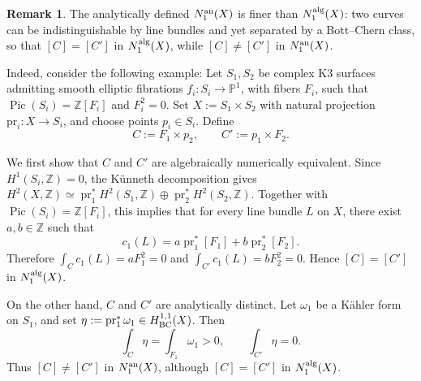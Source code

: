 \documentclass[11pt]{amsart}
\numberwithin{equation}{section}
\theoremstyle{definition}
\theoremstyle{definition}
\theoremstyle{definition}
\newtheorem{remark}[theorem]{Remark}
\begin{document}
\begin{remark}\label{l-anvsalg}
The analytically defined $N_1^{\rm an}(X)$ is finer than $N_1^{\rm alg}(X)$: two curves can be indistinguishable by line bundles and yet separated by a Bott–Chern class, so that $[C]=[C']$ in $N_1^{\rm alg}(X)$, while $[C]\neq[C']$ in $N_1^{\rm an}(X)$.

Indeed, consider the following example: Let $S_1,S_2$ be complex K3 surfaces admitting smooth elliptic fibrations $f_i:S_i\to \mathbb P^1$, with fibers $F_i$, such that $\operatorname{Pic}(S_i)=\mathbb Z[F_i]$ and $F_i^2=0$. Set $X:=S_1\times S_2$ with natural projection $\mathrm{pr}_i: X \to S_i$, and choose points $p_i\in S_i$. Define
$$
C:=F_1\times {p_2},\qquad C':={p_1}\times F_2.
$$

We first show that $C$ and $C'$ are algebraically numerically equivalent. Since $H^1(S_i,\mathbb Z)=0$, the Künneth decomposition gives $H^2(X,\mathbb Z)\simeq \operatorname{pr}_1^*H^2(S_1,\mathbb Z)\oplus \operatorname{pr}_2^*H^2(S_2,\mathbb Z)$. Together with $\operatorname{Pic}(S_i)=\mathbb Z[F_i]$, this implies that for every line bundle $L$ on $X$, there exist $a,b\in \mathbb Z$ such that
$$
c_1(L)=a\operatorname{pr}_1^*[F_1]+b\operatorname{pr}_2^*[F_2].
$$
Therefore $\int_C c_1(L)=aF_1^2=0$ and $\int_{C'}c_1(L)=bF_2^2=0$. Hence $[C]=[C']$ in $N_1^{\rm alg}(X)$.

On the other hand, $C$ and $C'$ are analytically distinct. Let $\omega_1$ be a K\"ahler form on $S_1$, and set $\eta:=\operatorname{pr}_1^*\omega_1\in H^{1,1}_{\rm BC}(X)$. Then
$$
\int_C\eta=\int_{F_1}\omega_1>0,\qquad \int_{C'}\eta=0.
$$
Thus $[C]\neq [C']$ in $N_1^{\rm an}(X)$, although $[C]=[C']$ in $N_1^{\rm alg}(X)$.
\end{remark}
\end{document}
